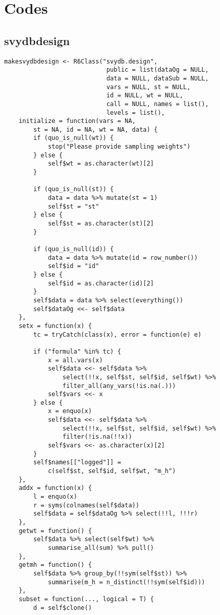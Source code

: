 
\chapter{Codes} \label{AppendixB}

\section{svydbdesign}
\begin{lstlisting}
makesvydbdesign <- R6Class("svydb.design", 
                            public = list(dataOg = NULL, 
                            data = NULL, dataSub = NULL, 
                            vars = NULL, st = NULL, 
                            id = NULL, wt = NULL, 
                            call = NULL, names = list(), 
                            levels = list(), 
    initialize = function(vars = NA, 
        st = NA, id = NA, wt = NA, data) {
        if (quo_is_null(wt)) {
            stop("Please provide sampling weights")
        } else {
            self$wt = as.character(wt)[2]
        }
        
        if (quo_is_null(st)) {
            data = data %>% mutate(st = 1)
            self$st = "st"
        } else {
            self$st = as.character(st)[2]
        }
        
        if (quo_is_null(id)) {
            data = data %>% mutate(id = row_number())
            self$id = "id"
        } else {
            self$id = as.character(id)[2]
        }
        self$data = data %>% select(everything())
        self$dataOg <<- self$data
    }, 
    setx = function(x) {
        tc = tryCatch(class(x), error = function(e) e)
        
        if ("formula" %in% tc) {
            x = all.vars(x)
            self$data <<- self$data %>% 
                select(!!x, self$st, self$id, self$wt) %>% 
                filter_all(any_vars(!is.na(.)))
            self$vars <<- x
        } else {
            x = enquo(x)
            self$data <<- self$data %>% 
                select(!!x, self$st, self$id, self$wt) %>% 
                filter(!is.na(!!x))
            self$vars <<- as.character(x)[2]
        }
        self$names[["logged"]] = 
            c(self$st, self$id, self$wt, "m_h")
    }, 
    addx = function(x) {
        l = enquo(x)
        r = syms(colnames(self$data))
        self$data = self$dataOg %>% select(!!l, !!!r)
    }, 
    getwt = function() {
        self$data %>% select(self$wt) %>% 
            summarise_all(sum) %>% pull()
    }, 
    getmh = function() {
        self$data %>% group_by(!!sym(self$st)) %>% 
            summarise(m_h = n_distinct(!!sym(self$id)))
    }, 
    subset = function(..., logical = T) {
        d = self$clone()
        

\end{lstlisting}
